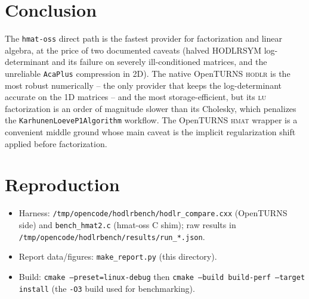 \documentclass[11pt]{article}
\newcommand{\ot}{OpenTURNS}
\begin{document}
\section{Conclusion}\label{sec:conclusion}

The \texttt{hmat-oss} direct path is the fastest provider for factorization and
linear algebra, at the price of two documented caveats (halved HODLRSYM
log-determinant and its failure on severely ill-conditioned matrices, and the
unreliable \texttt{AcaPlus} compression in 2D).  The native \ot{}
\textsc{hodlr} is the most robust numerically -- the only provider that keeps
the log-determinant accurate on the 1D matrices -- and the most
storage-efficient, but its \textsc{lu} factorization is an order of magnitude
slower than its Cholesky, which penalizes the \texttt{KarhunenLoeveP1Algorithm}
workflow.  The \ot{} \textsc{hmat} wrapper is a convenient middle ground whose
main caveat is the implicit regularization shift applied before factorization.

\appendix
\section*{Reproduction}\label{sec:repro}

\begin{itemize}
  \item Harness: \texttt{/tmp/opencode/hodlrbench/hodlr\_compare.cxx}
        (OpenTURNS side) and \texttt{bench\_hmat2.c} (hmat-oss C shim);
        raw results in \texttt{/tmp/opencode/hodlrbench/results/run\_*.json}.
  \item Report data/figures: \texttt{make\_report.py} (this directory).
  \item Build: \texttt{cmake --preset=linux-debug} then
        \texttt{cmake --build build-perf --target install} (the \texttt{-O3}
        build used for benchmarking).
\end{itemize}
\end{document}
